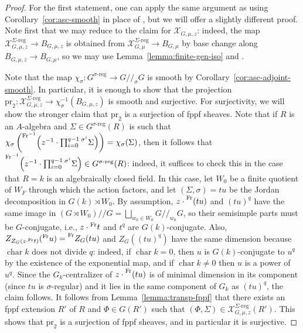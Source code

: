 \documentclass[11pt,reqno]{amsart}
\theoremstyle{definition}
\renewcommand{\rm}{\mathrm}
\newcommand{\sX}{{\mathscr X}}
\DeclareMathOperator{\chara}{char}
\begin{document}
\begin{proof}
    For the first statement, one can apply the same argument as \cite[Theorem 3.7]{Shotton-irreducible} using Corollary~\ref{cor:asc-smooth} in place of \cite[Corollary 3.5]{Integral-Springer}, but we will offer a slightly different proof. Note first that we may reduce to the claim for $\sX_{G, \mu, z}$: indeed, the map $\sX_{G, \mu, z}^{\Sigma\textrm{-}\mathrm{reg}} \to B_{G, \mu, z}$ is obtained from $\sX_{G, \mu}^{\Sigma\textrm{-}\mathrm{reg}} \to B_{G, \mu}$ by base change along $B_{G, \mu, z} \to B_{G, \mu}$, so we may use Lemma~\ref{lemma:finite-gen-iso} and \cite[Seconde partie, Th\'eor\`eme (1.2.4)]{Raynaud-Gruson}.
    
    Note that the map $\chi_\sigma\colon G^{\sigma\textrm{-reg}} \to G/\!/_\sigma G$ is smooth by Corollary~\ref{cor:asc-adjoint-smooth}. In particular, it is enough to show that the projection $\mathrm{pr}_2\colon \sX_{G, \mu, z}^{\Sigma\textrm{-reg}} \to \chi_\sigma^{-1}(B_{G,\mu,z})$ is smooth and surjective. For surjectivity, we will show the stronger claim that $\mathrm{pr}_2$ is a surjection of fppf sheaves. Note that if $R$ is an $A$-algebra and $\Sigma \in G^{\sigma\textrm{-reg}}(R)$ is such that $\chi_\sigma\left(\prescript{\rm{Fr}^{-1}}{}{\left(z^{-1} \cdot \prod_{i=0}^{q-1}\prescript{\sigma^i}{}{\Sigma}\right)}\right) = \chi_\sigma(\Sigma)$, then it follows that $\prescript{\rm{Fr}^{-1}}{}{\left(z^{-1} \cdot \prod_{i=0}^{q-1}\prescript{\sigma^i}{}{\Sigma}\right)} \in G^{\sigma\textrm{-reg}}(R)$: indeed, it suffices to check this in the case that $R = k$ is an algebraically closed field. In this case, let $W_0$ be a finite quotient of $W_F$ through which the action factors, and let $(\Sigma, \sigma) = tu$ be the Jordan decomposition in $G(k) \rtimes W_0$. By assumption, $z \cdot \prescript{\rm{Fr}}{}{(tu)}$ and $(tu)^q$ have the same image in $(G \rtimes W_0)/\!/G = \bigsqcup_{w_0 \in W_0} G/\!/_{w_0} G$, so their semisimple parts must be $G$-conjugate, i.e., $z \cdot \prescript{\rm{Fr}}{}{t}$ and $t^q$ are $G(k)$-conjugate. Also, $Z_{Z_G(z\cdot\prescript{\rm{Fr}}{}{t})}(\prescript{\rm{Fr}}{}{u}) = \prescript{\rm{Fr}}{}{Z_G(tu)}$ and $Z_G((tu)^q)$ have the same dimension because $\chara k$ does not divide $q$: indeed, if $\chara k = 0$, then $u$ is $G(k)$-conjugate to $u^q$ by the existence of the exponential map, and if $\chara k \neq 0$ then $u$ is a power of $u^q$. Since the $G_k$-centralizer of $z \cdot \prescript{\rm{Fr}}{}{(tu)}$ is of minimal dimension in its component (since $tu$ is $\sigma$-regular) and it lies in the same component of $G_k$ as $(tu)^q$, the claim follows. It follows from Lemma~\ref{lemma:transp-fppf} that there exists an fppf extension $R'$ of $R$ and $\Phi \in G(R')$ such that $(\Phi, \Sigma) \in \sX_{G, \mu, z}^{\Sigma\textrm{-reg}}(R')$. This shows that $\mathrm{pr}_2$ is a surjection of fppf sheaves, and in particular it is surjective.


\end{proof}
\end{document}
